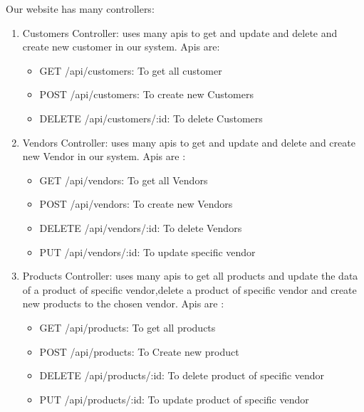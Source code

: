  
 Our website has many controllers:
  \begin{enumerate}
    \setcounter{enumi}{0}
    \item Customers Controller: uses many apis to get and update and delete and create new customer in our system. Apis are:
    \begin{itemize}
    \item GET /api/customers: To get all customer 

    \item POST /api/customers: To create new Customers

     \item DELETE /api/customers/:id: To delete Customers \newline
    \end{itemize} 

    \item Vendors Controller: uses many apis to get and update and delete and create new Vendor in our system. Apis are :
    \begin{itemize}
    \item GET /api/vendors: To get all Vendors 

    \item POST /api/vendors: To create new Vendors

     \item DELETE /api/vendors/:id: To delete Vendors
     
     \item PUT /api/vendors/:id: To update specific vendor \newline

    \end{itemize}
    
    \item Products Controller: uses many apis to get all products and update the data of a product of specific vendor,delete a product of specific vendor and create new products to the chosen vendor. 
	Apis are :
	\begin{itemize}
    \item GET /api/products: To get all products
    \item POST /api/products: To Create new product
     \item DELETE /api/products/:id: To delete product of specific vendor
     \item PUT /api/products/:id: To update product of specific vendor \newline
    \end{itemize} 


\end{enumerate}
